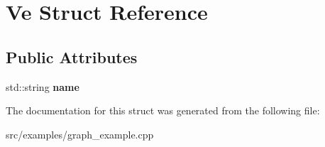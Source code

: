 \hypertarget{struct_ve}{}\section{Ve Struct Reference}
\label{struct_ve}
\subsection*{Public Attributes}
\begin{DoxyCompactItemize}
\item 
\mbox{\label{struct_ve_afee989787cac3868f33c533774d00cd3}} 
std\+::string {\bfseries name}
\end{DoxyCompactItemize}


The documentation for this struct was generated from the following file\+:\begin{DoxyCompactItemize}
\item 
src/examples/graph\+\_\+example.\+cpp\end{DoxyCompactItemize}
